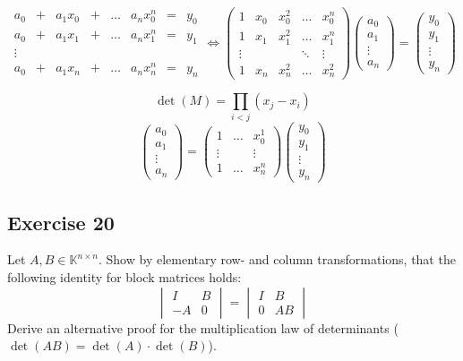 \documentclass[a4paper]{article}
\theoremstyle{definition}
\begin{document}
\[
  \begin{array}{cccccccc}
    a_0 & + & a_1 x_0 & + & \ldots & a_n x_0^n & = & y_0 \\
    a_0 & + & a_1 x_1 & + & \ldots & a_n x_1^n & = & y_1 \\
    \vdots & & & & & & & \\
    a_0 & + & a_1 x_n & + & \ldots & a_n x_n^n & = & y_n
  \end{array}
  \iff
  \begin{pmatrix}
    1 & x_0 & x_0^2 & \ldots & x_0^n \\
    1 & x_1 & x_1^2 & \ldots & x_1^n \\
    \vdots & &      & \ddots & \vdots \\
    1 & x_n & x_n^2 & \ldots & x_n^2
  \end{pmatrix} \begin{pmatrix}
    a_0 \\ a_1 \\ \vdots \\ a_n
  \end{pmatrix} = \begin{pmatrix}
    y_0 \\ y_1 \\ \vdots \\ y_n
  \end{pmatrix}
\]

\[ \det(M) = \prod_{i<j} (x_j - x_i) \]
\[
  \begin{pmatrix} a_0 \\ a_1 \\ \vdots \\ a_n \end{pmatrix}
  = \begin{pmatrix} 1 & \ldots & x_0^1 \\ \vdots & & \vdots \\ 1 & \ldots & x_n^n \end{pmatrix}
  \begin{pmatrix} y_0 \\ y_1 \\ \vdots \\ y_n \end{pmatrix}
\]

\subsection{Exercise 20}
\begin{ex}
  Let $A, B \in \mathbb K^{n\times n}$. Show by elementary row- and column transformations, that the following identity for block matrices holds:
  \[
    \begin{vmatrix}
     I & B \\
     -A & 0
    \end{vmatrix} = \begin{vmatrix}
      I & B \\
      0 & AB
    \end{vmatrix}
  \]
  Derive an alternative proof for the multiplication law of determinants ($\det(AB) = \det(A) \cdot \det(B)$).
\end{ex}
\end{document}
